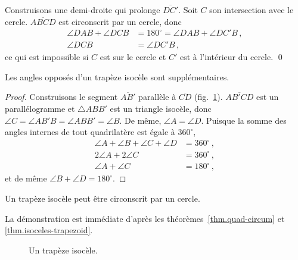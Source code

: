 Construisons une demi-droite qui prolonge $\overline{DC'}$. Soit $C$ son intersection avec le cercle. $\overline{ABCD}$ est circonscrit par un cercle, donc 
\begin{align*}
\angle DAB + \angle DCB &=  180^\circ = \angle DAB + \angle DC'B\,,\\
\angle DCB &= \angle DC'B\,,
\end{align*}
ce qui est impossible si $C$ est sur le cercle et $C'$ est à l'intérieur du cercle. \qed

\begin{theorem}\label{thm.isoceles-trapezoid}
Les angles opposés d'un trapèze isocèle sont supplémentaires.
\end{theorem}
\begin{proof}
Construisons le segment $\overline{AB'}$ parallèle à $\overline{CD}$ (fig.~\ref{f.trap-3}). $\overline{AB'CD}$ est un parallélogramme et  $\triangle ABB'$ est un triangle isocèle, donc $\angle C= \angle AB'B = \angle ABB' = \angle B$. De même, $\angle A = \angle D$. Puisque la somme des angles internes de tout quadrilatère est égale à $360^\circ$,
\begin{align*}
\angle A + \angle B + \angle C + \angle D &= 360^\circ\,,\\
2\angle A + 2 \angle C &= 360^\circ\,,\\
\angle A +  \angle C &= 180^\circ\,,
\end{align*}
et de même $\angle B +  \angle D = 180^\circ$.
\end{proof}

\begin{theorem}
Un trapèze isocèle peut être circonscrit par un cercle.
\end{theorem}
La démonstration est immédiate d'après les théorèmes~\ref{thm.quad-circum} et  \ref{thm.isoceles-trapezoid}.

\begin{figure}[htbp]
\centering

\caption{Un trapèze isocèle.}\label{f.trap-3}
\end{figure}

